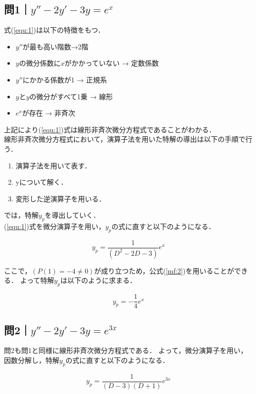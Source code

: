 \documentclass[a4paper,11pt]{bxjsarticle}
\begin{document}
\subsection{問1｜$y''-2y'-3y=e^x$}
式(\ref{equ:1})は以下の特徴をもつ．

\begin{itemize}
  \item $y''$が最も高い階数→2階
  \item $y$の微分係数に$x$がかかっていない → 定数係数
  \item $y''$にかかる係数が1 → 正規系
  \item $y$と$y$の微分がすべて1乗 → 線形
  \item $e^x$が存在 → 非斉次
\end{itemize}

上記により(\ref{equ:1})式は線形非斉次微分方程式であることがわかる．\\

線形非斉次微分方程式において，演算子法を用いた特解の導出は以下の手順で行う．

\begin{enumerate}
  \item 演算子法を用いて表す．
  \item yについて解く．
  \item 変形した逆演算子を用いる．
\end{enumerate}

では，特解$y_p$を導出していく．\\
(\ref{equ:1})式を微分演算子を用い，$y_p$の式に直すと以下のようになる．

\begin{equation}
  y_p = \frac{1}{(D^2-2D-3)}e^x
\end{equation}

ここで，$(P(1)=-4\neq 0)$が成り立つため，公式(\ref{mf:2})を用いることができる．
よって特解$y_p$は以下のように求まる．

\begin{equation}
  y_p = -\frac{1}{4}e^{x}
\end{equation}

\subsection{問2｜$y''-2y'-3y=e^{3x}$}
問2も問1と同様に線形非斉次微分方程式である．
よって，微分演算子を用い，因数分解し，特解$y_p$の式に直すと以下のようになる．

\begin{equation}
  y_p = \frac{1}{(D-3)(D+1)}e^{3x}
\end{equation}
\end{document}

